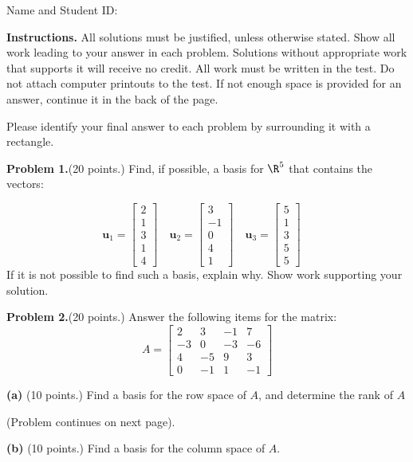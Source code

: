 \documentclass[12pt]{article}
\begin{document}
Name and Student ID: \hrulefill


\textbf{Instructions.} All solutions must be justified, unless otherwise stated. Show all work leading to your answer in each problem. Solutions without appropriate work that supports it will receive no credit. All work must be written in the test. Do not attach computer printouts to the test. If not enough space is provided for an answer, continue it in the back of the page.

Please identify your final answer to each problem by surrounding it with a rectangle.


\clearpage


\textbf{Problem 1.}(20 points.) 
Find, if possible, a basis for $\R^5$ that contains the vectors:

$$
\mathbf{u}_1=\left[\begin{matrix}2\\1\\3\\1\\4\end{matrix}\right]\quad
\mathbf{u}_2=\left[\begin{matrix}3\\-1\\0\\4\\1\end{matrix}\right]\quad
\mathbf{u}_3=\left[\begin{matrix}5\\1\\3\\5\\5\end{matrix}\right]\quad
$$
If it is not possible to find such a basis, explain why. Show work supporting your solution.

\clearpage

\textbf{Problem 2.}(20 points.)
Answer the following items for the matrix:
\[
A=
\begin{bmatrix}2&3&-1&7\\-3&0&-3&-6\\4&-5&9&3\\0&-1&1&-1\end{bmatrix}
\] 

\textbf{(a)} (10 points.) Find a basis for the row space of $A$, and determine the rank of $A$

\vfill
(Problem continues on next page).
\clearpage

\textbf{(b)} (10 points.) Find a basis for the column space of $A$.
\end{document}
